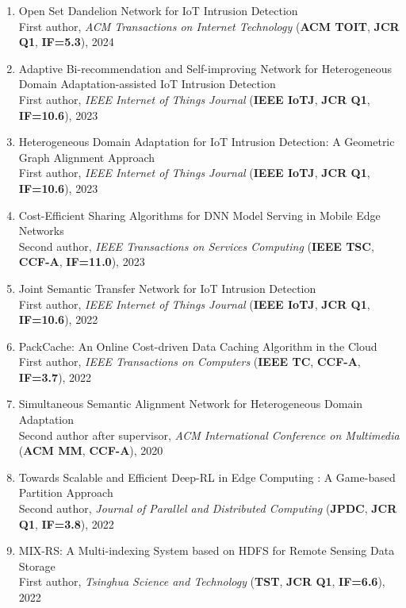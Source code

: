 \documentclass[letterpaper,10.9pt]{article}
\begin{document}
\begin{enumerate}
  \item Open Set Dandelion Network for IoT Intrusion Detection\\
  First author, \textit{ACM Transactions on Internet Technology} (\textbf{ACM TOIT}, \textbf{JCR Q1}, \textbf{IF=5.3}), 2024

  \item Adaptive Bi-recommendation and Self-improving Network for Heterogeneous Domain Adaptation-assisted IoT Intrusion Detection\\
  First author, \textit{IEEE Internet of Things Journal} (\textbf{IEEE IoTJ}, \textbf{JCR Q1}, \textbf{IF=10.6}), 2023

  \item Heterogeneous Domain Adaptation for IoT Intrusion Detection: A Geometric Graph Alignment Approach\\
  First author, \textit{IEEE Internet of Things Journal} (\textbf{IEEE IoTJ}, \textbf{JCR Q1}, \textbf{IF=10.6}), 2023

  \item Cost-Efficient Sharing Algorithms for DNN Model Serving in Mobile Edge Networks\\
  Second author, \textit{IEEE Transactions on Services Computing} (\textbf{IEEE TSC}, \textbf{CCF-A}, \textbf{IF=11.0}), 2023

  \item Joint Semantic Transfer Network for IoT Intrusion Detection\\
  First author, \textit{IEEE Internet of Things Journal} (\textbf{IEEE IoTJ}, \textbf{JCR Q1}, \textbf{IF=10.6}), 2022

  \item PackCache: An Online Cost-driven Data Caching Algorithm in the Cloud\\
  First author, \textit{IEEE Transactions on Computers} (\textbf{IEEE TC}, \textbf{CCF-A}, \textbf{IF=3.7}), 2022

  \item Simultaneous Semantic Alignment Network for Heterogeneous Domain Adaptation\\
  Second author after supervisor, \textit{ACM International Conference on Multimedia} (\textbf{ACM MM}, \textbf{CCF-A}), 2020

  \item Towards Scalable and Efficient Deep-RL in Edge Computing : A Game-based Partition Approach\\
  Second author, \textit{Journal of Parallel and Distributed Computing} (\textbf{JPDC}, \textbf{JCR Q1}, \textbf{IF=3.8}), 2022

  \item MIX-RS: A Multi-indexing System based on HDFS for Remote Sensing Data Storage\\
  First author, \textit{Tsinghua Science and Technology} (\textbf{TST}, \textbf{JCR Q1}, \textbf{IF=6.6}), 2022
\end{enumerate}
\end{document}
